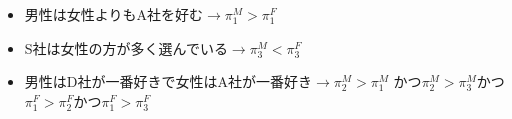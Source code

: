 \begin{itemize}
	\item 男性は女性よりもA社を好む$\to \pi_1^M > \pi_1^F$
	\item S社は女性の方が多く選んでいる$\to \pi_3^M < \pi_3^F$
	\item 男性はD社が一番好きで女性はA社が一番好き$\to \pi_2^M > \pi_1^M$ かつ$\pi_2^M > \pi_3^M$かつ$\pi_1^F > \pi_2^F $かつ$ \pi_1^F > \pi_3^F$
\end{itemize}
